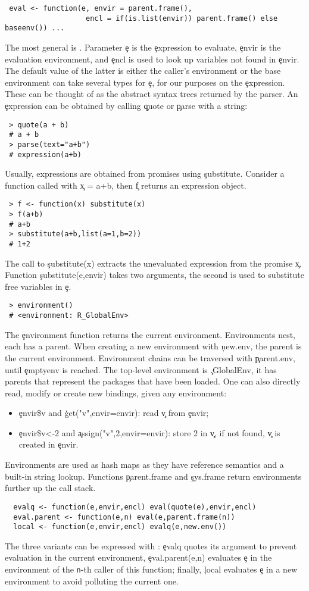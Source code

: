 \documentclass[review,screen,acmsmall,anonymous=true]{acmart}
\begin{document}
\begin{lstlisting}
 eval <- function(e, envir = parent.frame(),
                   encl = if(is.list(envir)) parent.frame() else baseenv()) ...
\end{lstlisting}
The most general is \eval. Parameter \c e is the \c{expression} to evaluate,
\c{envir} is the evaluation environment, and \c{encl} is used to look up
variables not found in \c{envir}. The default value of the latter is either the
caller's environment or the base environment \Eval can take several types for \c e, for
our purposes on the \c{expression}. These can be thought of as the abstract
syntax trees returned by the parser. An \c{expression} can be obtained by
calling \c{quote} or \c{parse} with a string:
\begin{lstlisting}
 > quote(a + b)
 # a + b
 > parse(text="a+b")
 # expression(a+b)
\end{lstlisting}
Usually, expressions are obtained from promises using \c{substitute}. Consider a
function called with \c{x = a+b}, then \c f returns an expression object.
\begin{lstlisting}
 > f <- function(x) substitute(x)
 > f(a+b)
 # a+b
 > substitute(a+b,list(a=1,b=2))
 # 1+2
\end{lstlisting}
The call to \c{substitute(x)} extracts the unevaluated expression from the
promise \c x. Function \c{substitute(e,envir)} takes two arguments, the second
is used to substitute free variables in \c e.
\begin{lstlisting}
 > environment()
 # <environment: R_GlobalEnv>
\end{lstlisting}
The \c{environment} function returns the current environment. Environments nest,
each has a parent. When creating a new environment with \c{new.env}, the parent
is the current environment. Environment chains can be traversed with
\c{parent.env}, until \c{emptyenv} is reached. The top-level environment is
\c{.GlobalEnv}, it has parents that represent the packages that have been
loaded. One can also directly read, modify or create new bindings, given any
environment:
\begin{itemize}
\item \c{envir\$v} and \c{get("v",envir=envir)}: read  \c{v} from \c{envir};
\item \c{envir\$v<-2} and \c{assign("v",2,envir=envir)}: store 2 in \c{v}, if
  not found, \c{v} is created in \c{envir}.
\end{itemize}
\noindent Environments are used as hash maps as they have reference semantics
and a built-in string lookup. Functions \c{parent.frame} and \c{sys.frame}
return environments further up the call stack.
 \begin{lstlisting}
  evalq <- function(e,envir,encl) eval(quote(e),envir,encl)
  eval.parent <- function(e,n) eval(e,parent.frame(n))
  local <- function(e,envir,encl) evalq(e,new.env())
\end{lstlisting}
The three variants can be expressed with \eval: \c{evalq} quotes its
argument to prevent evaluation in the current environment,
\c{eval.parent(e,n)} evaluates \c{e} in the environment of the {\tt n}-th
caller of this function; finally, \c{local} evaluates \c{e} in a new environment
to avoid polluting the current one.
\end{document}
